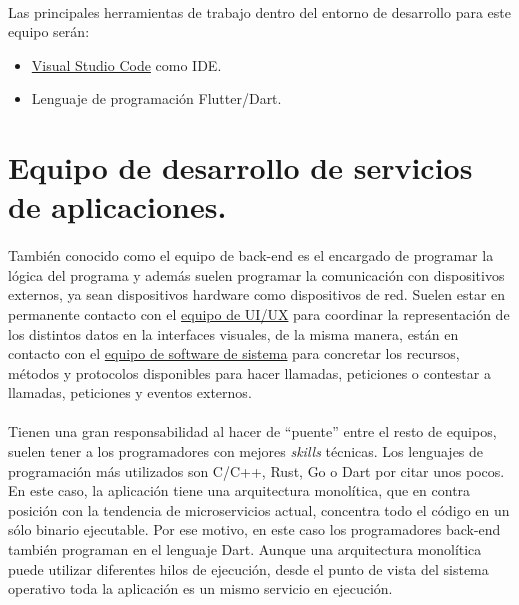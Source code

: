 \paragraph{}Las principales herramientas de trabajo dentro del entorno de desarrollo
para este equipo serán:

\begin{itemize}
    \item \hyperref[sec:vscode]{Visual Studio Code} como \gls{IDE}.
    \item Lenguaje de programación Flutter/Dart.
\end{itemize}

\section{Equipo de desarrollo de servicios de aplicaciones.}

\paragraph{}También conocido como el equipo de \gls{back-end} es el encargado de programar
la lógica del programa y además suelen programar la comunicación con dispositivos externos,
ya sean dispositivos hardware como dispositivos de red. Suelen estar en permanente
contacto con el \hyperref[sec:uiteam]{equipo de UI/UX} para coordinar la representación
de los distintos datos en la interfaces visuales, de la misma manera, están en contacto
con el \hyperref[sec:systemteam]{equipo de software de sistema} para concretar los
recursos, métodos y protocolos disponibles para hacer llamadas, peticiones o contestar
a llamadas, peticiones y eventos externos.

\paragraph{}Tienen una gran responsabilidad al hacer de ``puente'' entre el resto de
equipos, suelen tener a los programadores con mejores \emph{skills} técnicas. Los
lenguajes de programación más utilizados son C/C++, Rust, Go o Dart por citar unos pocos.
En este caso, la aplicación tiene una arquitectura monolítica, que en contra posición
con la tendencia de microservicios actual, concentra todo el código en un sólo binario
ejecutable. Por ese motivo, en este caso los programadores \gls{back-end} también
programan en el lenguaje Dart. Aunque una arquitectura monolítica puede utilizar diferentes
hilos de ejecución, desde el punto de vista del sistema operativo toda la aplicación es un
mismo servicio en ejecución.

